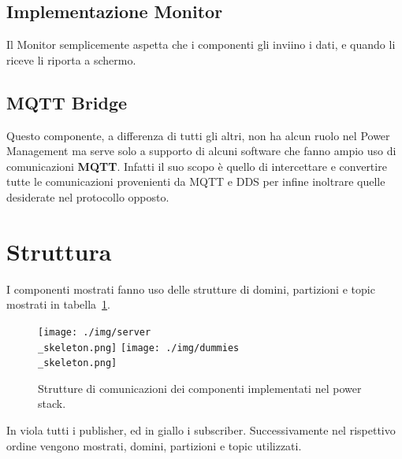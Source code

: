 \subsection*{Implementazione Monitor}
Il Monitor semplicemente aspetta che i componenti gli inviino i dati, e quando li riceve li riporta a schermo.

\subsection*{MQTT Bridge}
Questo componente, a differenza di tutti gli altri, non ha alcun ruolo nel Power Management ma serve solo a supporto di alcuni software che fanno ampio uso di comunicazioni \textbf{MQTT}\cite{mqtt}. Infatti il suo scopo è quello di intercettare e convertire tutte le comunicazioni provenienti da MQTT e DDS per infine inoltrare quelle desiderate nel protocollo opposto.%

\section{Struttura}
I componenti mostrati fanno uso delle strutture di domini, partizioni e topic mostrati in tabella~\ref{fig:dummy_topic}.

\begin{figure}[H]
    \centering
    \texttt{[image: ./img/server\\\_skeleton.png]}
    \texttt{[image: ./img/dummies\\\_skeleton.png]}
    \caption{ Strutture di comunicazioni dei componenti implementati nel power stack.}
    \label{fig:dummy_topic}
\end{figure}
In viola tutti i publisher, ed in giallo i subscriber. Successivamente nel rispettivo ordine vengono mostrati, domini, partizioni e topic utilizzati.
